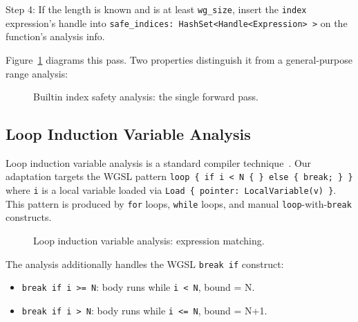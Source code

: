 \documentclass[11pt,a4paper]{article}
\begin{document}
Step 4: If the length is known and is at least \texttt{wg\_size}, insert the
  \texttt{index} expression's handle into
  \texttt{safe\_indices: HashSet<Handle<Expression>\,>} on the function's
  analysis info.

Figure~\ref{fig:interval_alg} diagrams this pass. Two properties distinguish
it from a general-purpose range analysis:

\begin{figure}[htbp]
\centering
{}
\caption{Builtin index safety analysis: the single forward pass.}
\label{fig:interval_alg}
\end{figure}

\subsection{Loop Induction Variable Analysis}
\label{sec:loop}

Loop induction variable analysis is a standard compiler
technique~\cite{muchnick1997}. Our adaptation targets the WGSL pattern
\texttt{loop \{ if i < N \{ \} else \{ break; \} \}} where \texttt{i} is a
local variable loaded via \texttt{Load \{ pointer: LocalVariable(v) \}}. This
pattern is produced by \texttt{for} loops, \texttt{while} loops, and manual
\texttt{loop}-with-\texttt{break} constructs.

\begin{figure}[htbp]
\centering
{}
\caption{Loop induction variable analysis: expression matching.}
\label{fig:loop_alg}
\end{figure}

The analysis additionally handles the WGSL \texttt{break if} construct:
\begin{itemize}
  \item \texttt{break if i >= N}: body runs while \texttt{i < N}, bound = N.
  \item \texttt{break if i > N}: body runs while \texttt{i <= N}, bound = N+1.
\end{itemize}
\end{document}

